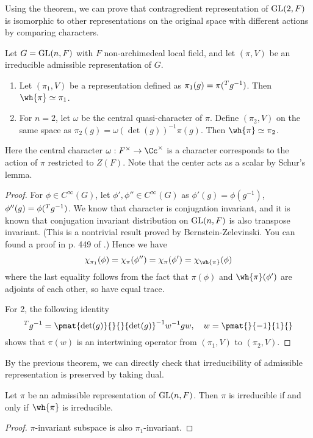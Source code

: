 Using the theorem, we can prove that contragredient representation of $\mathrm{GL}(2, F)$ is isomorphic to other representations on the original space with different actions by comparing characters. 
\begin{theorem}
\label{contra}
Let $G = \mathrm{GL}(n, F)$ with $F$ non-archimedeal local field, and let $(\pi, V)$ be an irreducible admissible representation of $G$. 
\begin{enumerate}
\item Let $(\pi_{1}, V)$ be a representation defined as $\pi_{1}(g) = \pi(\prescript{T}{}{}g^{-1})$. Then $\wh{\pi}\simeq \pi_{1}$. 
\item For $n = 2$, let $\omega$ be the central quasi-character of $\pi$. Define $(\pi_{2}, V)$ on the same space as $\pi_{2}(g) = \omega(\det(g))^{-1}\pi(g)$. Then $\wh{\pi} \simeq \pi_{2}$. 
\end{enumerate}
\end{theorem}
Here the central character $\omega:F^{\times} \to \Cc^{\times}$ is a character corresponds to the action of $\pi$ restricted to $Z(F)$. Note that the center acts as a scalar by Schur's lemma. 
\begin{proof}
For $\phi\in C^{\infty}(G)$, let $\phi', \phi''\in C^{\infty}(G)$ as $\phi'(g) = \phi(g^{-1})$, $\phi''(g) = \phi(\prescript{T}{}{}g^{-1})$. We know that character is conjugation invariant, and it is known that conjugation invariant distribution on $\mathrm{GL}(n, F)$ is also transpose invariant. (This is a nontrivial result proved by Bernstein-Zelevinski. You can found a proof in p. 449 of \cite{bu}.)
Hence we have
$$
\chi_{\pi_{1}}(\phi) = \chi_{\pi}(\phi'') = \chi_{\pi}(\phi') = \chi_{\wh{\pi}}(\phi)
$$
where the last equality follows from the fact that $\pi(\phi)$ and $\wh{\pi}(\phi')$ are adjoints of each other, so have equal trace. 

For 2, the following identity
$$
\pre{T}{}g^{-1} = \pmat{\det(g)}{}{}{\det(g)}^{-1} w^{-1}gw, \quad w = \pmat{}{-1}{1}{}
$$
shows that $\pi(w)$ is an intertwining operator from $(\pi_{1}, V)$ to $(\pi_{2}, V)$. 
\end{proof}

By the previous theorem, we can directly check that irreducibility of admissible representation is preserved by taking dual. 
\begin{proposition}
Let $\pi$ be an admissible representation of $\mathrm{GL}(n, F)$. Then $\pi$ is irreducible if and only if $\wh{\pi}$ is irreducible. 
\end{proposition}
\begin{proof}
$\pi$-invariant subspace is also $\pi_{1}$-invariant. 
\end{proof}

